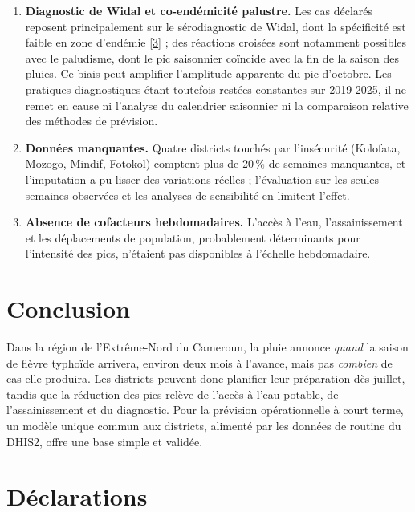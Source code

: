 \documentclass[11pt]{article}
\begin{document}
\begin{enumerate}[label=\arabic*.,leftmargin=1.6em]
\item \textbf{Diagnostic de Widal et co-endémicité palustre.} Les cas déclarés reposent principalement sur le sérodiagnostic de Widal, dont la spécificité est faible en zone d'endémie [\hyperlink{ref3}{3}] ; des réactions croisées sont notamment possibles avec le paludisme, dont le pic saisonnier coïncide avec la fin de la saison des pluies. Ce biais peut amplifier l'amplitude apparente du pic d'octobre. Les pratiques diagnostiques étant toutefois restées constantes sur 2019-2025, il ne remet en cause ni l'analyse du calendrier saisonnier ni la comparaison relative des méthodes de prévision.
\item \textbf{Données manquantes.} Quatre districts touchés par l'insécurité (Kolofata, Mozogo, Mindif, Fotokol) comptent plus de 20\,\% de semaines manquantes, et l'imputation a pu lisser des variations réelles ; l'évaluation sur les seules semaines observées et les analyses de sensibilité en limitent l'effet.
\item \textbf{Absence de cofacteurs hebdomadaires.} L'accès à l'eau, l'assainissement et les déplacements de population, probablement déterminants pour l'intensité des pics, n'étaient pas disponibles à l'échelle hebdomadaire.
\end{enumerate}

\section{Conclusion}
Dans la région de l'Extrême-Nord du Cameroun, la pluie annonce \textit{quand} la saison de fièvre typhoïde arrivera, environ deux mois à l'avance, mais pas \textit{combien} de cas elle produira. Les districts peuvent donc planifier leur préparation dès juillet, tandis que la réduction des pics relève de l'accès à l'eau potable, de l'assainissement et du diagnostic. Pour la prévision opérationnelle à court terme, un modèle unique commun aux districts, alimenté par les données de routine du DHIS2, offre une base simple et validée.

\section*{Déclarations}
\end{document}
